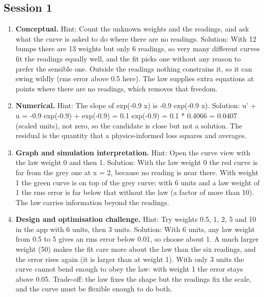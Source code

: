 \documentclass[11pt,a4paper]{article}
\begin{document}
\subsection*{Session 1}
\begin{enumerate}[nosep]
\item \textbf{Conceptual.} Hint: Count the unknown weights and the readings, and ask what the curve is asked to do where there are no readings. Solution: With 12 bumps there are 13 weights but only 6 readings, so very many different curves fit the readings equally well, and the fit picks one without any reason to prefer the sensible one. Outside the readings nothing constrains it, so it can swing wildly (rms error above 0.5 here). The law supplies extra equations at points where there are no readings, which removes that freedom.
\item \textbf{Numerical.} Hint: The slope of exp(-0.9 x) is -0.9 exp(-0.9 x). Solution: u' + u = -0.9 exp(-0.9) + exp(-0.9) = 0.1 exp(-0.9) = 0.1 * 0.4066 = 0.0407 (scaled units), not zero, so the candidate is close but not a solution. The residual is the quantity that a physics-informed loss squares and averages.
\item \textbf{Graph and simulation interpretation.} Hint: Open the curve view with the law weight 0 and then 1. Solution: With the law weight 0 the red curve is far from the grey one at x = 2, because no reading is near there. With weight 1 the green curve is on top of the grey curve: with 6 units and a law weight of 1 the rms error is far below that without the law (a factor of more than 10). The law carries information beyond the readings.
\item \textbf{Design and optimisation challenge.} Hint: Try weights 0.5, 1, 2, 5 and 10 in the app with 6 units, then 3 units. Solution: With 6 units, any law weight from 0.5 to 5 gives an rms error below 0.01, so choose about 1. A much larger weight (50) makes the fit care more about the law than the six readings, and the error rises again (it is larger than at weight 1). With only 3 units the curve cannot bend enough to obey the law: with weight 1 the error stays above 0.05. Trade-off: the law fixes the shape but the readings fix the scale, and the curve must be flexible enough to do both.
\end{enumerate}
\end{document}
